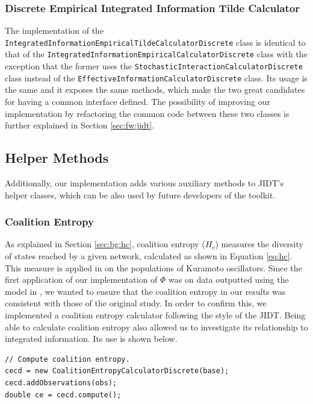 \documentclass[a4paper,11pt]{article}
\begin{document}
\subsubsection{Discrete Empirical Integrated Information Tilde Calculator}
\label{sec:impl:ii-tilde:calculator}

The implementation of the \texttt{IntegratedInformationEmpiricalTildeCalculatorDiscrete} class is identical to that of the \texttt{IntegratedInformationEmpiricalCalculatorDiscrete} class with the exception that the former uses the \texttt{StochasticInteractionCalculatorDiscrete} class instead of the \texttt{EffectiveInformationCalculatorDiscrete} class. Its usage is the same and it exposes the same methods, which make the two great candidates for having a common interface defined. The possibility of improving our implementation by refactoring the common code between these two classes is further explained in Section \ref{sec:fw:jidt}.

\subsection{Helper Methods}
Additionally, our implementation adds various auxiliary methods to JIDT's helper classes, which can be also used by future developers of the toolkit.

\subsubsection{Coalition Entropy}
\label{sec:impl:hc}

As explained in Section \ref{sec:bg:hc}, coalition entropy ($H_c$) measures the diversity of states reached by a given network, calculated as shown in Equation \ref{eq:hc}. This measure is applied in \cite{Shanahan2010} on the populations of Kuramoto oscillators. Since the first application of our implementation of $\Phi$ was on data outputted using the model in \cite{Shanahan2010}, we wanted to ensure that the coalition entropy in our results was consistent with those of the original study. In order to confirm this, we implemented a coalition entropy calculator following the style of the JIDT. Being able to calculate coalition entropy also allowed us to investigate its relationship to integrated information. Its use is shown below.

\begin{verbatim}
// Compute coalition entropy.
cecd = new CoalitionEntropyCalculatorDiscrete(base);
cecd.addObservations(obs);
double ce = cecd.compute();
\end{verbatim}
\end{document}
